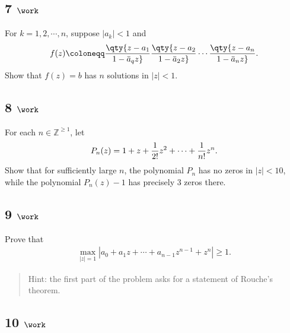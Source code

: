 \hypertarget{work-63}{%
\subsection{\texorpdfstring{7
\(\work\)}{7 \textbackslash work}}\label{work-63}}

For \(k=1,2,\cdots, n\), suppose
\({\left\lvert {a_k} \right\rvert} < 1\) and
\begin{align*}
f(z) \coloneqq\qty{z - a_1 \over 1 - \mkern 1.5mu\overline{\mkern-1.5mua\mkern-1.5mu}\mkern 1.5mu_q z} \qty{z-a_2 \over 1 - \mkern 1.5mu\overline{\mkern-1.5mua\mkern-1.5mu}\mkern 1.5mu_2 z} \cdots \qty{z - a_n \over 1 - \mkern 1.5mu\overline{\mkern-1.5mua\mkern-1.5mu}\mkern 1.5mu_n z}
.\end{align*}
Show that \(f(z) = b\) has \(n\) solutions in
\({\left\lvert {z} \right\rvert} < 1\).

\hypertarget{work-64}{%
\subsection{\texorpdfstring{8
\(\work\)}{8 \textbackslash work}}\label{work-64}}

For each \(n\in {\mathbb{Z}}^{\geq 1}\), let
\begin{align*}
P_n(z) = 1 + z + {1\over 2!} z^2 + \cdots + {1\over n!}z^n
.\end{align*}
Show that for sufficiently large \(n\), the polynomial \(P_n\) has no
zeros in \({\left\lvert {z} \right\rvert} < 10\), while the polynomial
\(P_n(z) - 1\) has precisely 3 zeros there.

\hypertarget{work-65}{%
\subsection{\texorpdfstring{9
\(\work\)}{9 \textbackslash work}}\label{work-65}}

Prove that
\begin{align*}
\max_{{\left\lvert {z} \right\rvert} = 1} {\left\lvert {a_0 + a_1 z + \cdots + a_{n-1}z^{n-1} + z^n} \right\rvert} \geq 1
.\end{align*}

\begin{quote}
Hint: the first part of the problem asks for a statement of Rouche's
theorem.
\end{quote}

\hypertarget{work-66}{%
\subsection{\texorpdfstring{10
\(\work\)}{10 \textbackslash work}}\label{work-66}}


